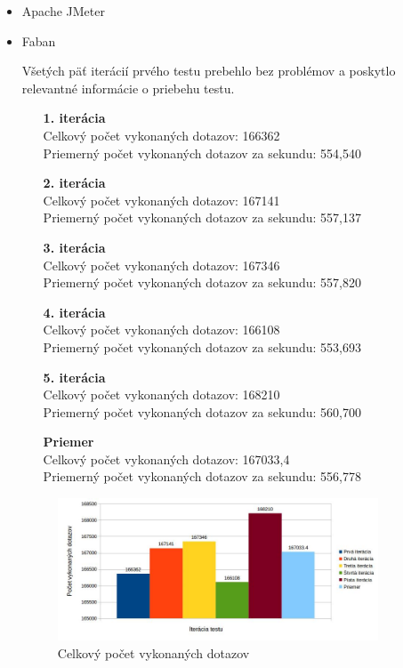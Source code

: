 \documentclass[12pt,oneside,final]{fithesis-utf8}
\begin{document}
\begin{itemize}

\item Apache JMeter

\item Faban

Všetých päť iterácií prvého testu prebehlo bez problémov a poskytlo relevantné informácie o priebehu testu.

\begin{itemize}

\item[\textbf{1. iterácia}]\ \\
Celkový počet vykonaných dotazov: 166362\\
Priemerný počet vykonaných dotazov za sekundu: 554,540

\item[\textbf{2. iterácia}]\ \\
Celkový počet vykonaných dotazov: 167141\\
Priemerný počet vykonaných dotazov za sekundu: 557,137

\item[\textbf{3. iterácia}]\ \\
Celkový počet vykonaných dotazov: 167346\\
Priemerný počet vykonaných dotazov za sekundu: 557,820

\item[\textbf{4. iterácia}]\ \\
Celkový počet vykonaných dotazov: 166108\\
Priemerný počet vykonaných dotazov za sekundu: 553,693

\item[\textbf{5. iterácia}]\ \\
Celkový počet vykonaných dotazov: 168210\\
Priemerný počet vykonaných dotazov za sekundu: 560,700

\item[\textbf{Priemer}]\ \\
Celkový počet vykonaných dotazov: 167033,4\\
Priemerný počet vykonaných dotazov za sekundu: 556,778

\end{itemize}

\begin{figure}[H]
  \centering
      \includegraphics[width=0.9\textwidth]{faban1.jpg}
  \caption{Celkový počet vykonaných dotazov}
\end{figure}


\end{itemize}
\end{document}
